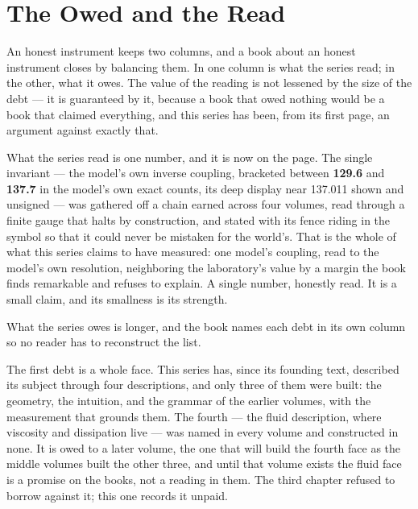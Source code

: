 \chapter{The Owed and the Read}

An honest instrument keeps two columns, and a book about an honest
instrument closes by balancing them. In one column is what the series
read; in the other, what it owes. The value of the reading is not lessened
by the size of the debt --- it is guaranteed by it, because a book that
owed nothing would be a book that claimed everything, and this series has
been, from its first page, an argument against exactly that.

What the series read is one number, and it is now on the page. The single
invariant --- the model's own inverse coupling, bracketed between
\textbf{129.6} and \textbf{137.7} in the model's own exact counts, its
deep display near 137.011 shown and unsigned --- was gathered off a chain
earned across four volumes, read through a finite gauge that halts by
construction, and stated with its fence riding in the symbol so that it
could never be mistaken for the world's. That is the whole of what this
series claims to have measured: one model's coupling, read to the model's
own resolution, neighboring the laboratory's value by a margin the book
finds remarkable and refuses to explain. A single number, honestly read.
It is a small claim, and its smallness is its strength.

What the series owes is longer, and the book names each debt in its own
column so no reader has to reconstruct the list.

The first debt is a whole face. This series has, since its founding text,
described its subject through four descriptions, and only three of them
were built: the geometry, the intuition, and the grammar of the earlier
volumes, with the measurement that grounds them. The fourth --- the fluid
description, where viscosity and dissipation live --- was named in every
volume and constructed in none. It is owed to a later volume, the one that
will build the fourth face as the middle volumes built the other three,
and until that volume exists the fluid face is a promise on the books, not
a reading in them. The third chapter refused to borrow against it; this
one records it unpaid.

